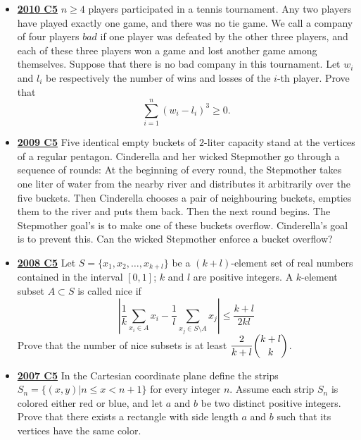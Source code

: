 \documentclass[11pt]{scrartcl}
\begin{document}
\begin{itemize}[leftmargin=*]
Considering all possible starting positions, determine the latest possible moment at which the last ant falls off the checkerboard, or prove that such a moment does not necessarily exist.
    \item \href{https://artofproblemsolving.com/community/c6h418688p2362302}{\textbf{2010 C5}} $n \geqslant  4$ players participated in a tennis tournament. Any two players have played exactly one game, and there was no tie game. We call a company of four players $bad$ if one player was defeated by the other three players, and each of these three players won a game and lost another game among themselves. Suppose that there is no bad company in this tournament. Let $w_i$ and $l_i$ be respectively the number of wins and losses of the $i$-th player. Prove that\[\sum^n_{i=1} \left(w_i - l_i\right)^3 \geqslant  0.\]
    \newpage
    \item \href{https://artofproblemsolving.com/community/c6h355786p1932930}{\textbf{2009 C5}} Five identical empty buckets of $2$-liter capacity stand at the vertices of a regular pentagon. Cinderella and her wicked Stepmother go through a sequence of rounds: At the beginning of every round, the Stepmother takes one liter of water from the nearby river and distributes it arbitrarily over the five buckets. Then Cinderella chooses a pair of neighbouring buckets, empties them to the river and puts them back. Then the next round begins. The Stepmother goal's is to make one of these buckets overflow. Cinderella's goal is to prevent this. Can the wicked Stepmother enforce a bucket overflow?
    \item \href{https://artofproblemsolving.com/community/c6h287861p1555908}{\textbf{2008 C5}} Let $ S = \{x_1, x_2, \dots, x_{k + l}\}$ be a $ (k + l)$-element set of real numbers contained in the interval $ [0, 1]$; $ k$ and $ l$ are positive integers. A $ k$-element subset $ A\subset S$ is called nice if
\[ \left |\frac {1}{k}\sum_{x_i\in A} x_i - \frac {1}{l}\sum_{x_j\in S\setminus A} x_j\right |\leqslant \frac {k + l}{2kl}\]
Prove that the number of nice subsets is at least $ \dfrac{2}{k + l}\dbinom{k + l}{k}$.
    \item \href{https://artofproblemsolving.com/community/c6h195043p1071276}{\textbf{2007 C5}} In the Cartesian coordinate plane define the strips $ S_n = \{(x,y)|n\leqslant x < n + 1\}$ for every integer $ n.$ Assume each strip $ S_n$ is colored either red or blue, and let $ a$ and $ b$ be two distinct positive integers. Prove that there exists a rectangle with side length $ a$ and $ b$ such that its vertices have the same color.

\end{itemize}
\end{document}
